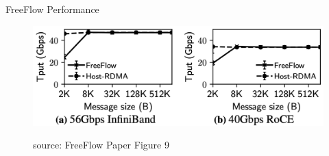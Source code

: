\documentclass{beamer}
\begin{document}
\begin{frame}{FreeFlow Performance}
    \begin{figure}
        \centering
        \begin{minipage}{.45\textwidth}
        \includegraphics[width=\textwidth]{perfgraph1.png}
        \vspace{-25pt}
        \begin{center}
            \fontsize{4pt}{4pt}\selectfont source: FreeFlow Paper Figure 9
        \end{center}


\end{minipage}
\end{figure}
\end{frame}
\end{document}
